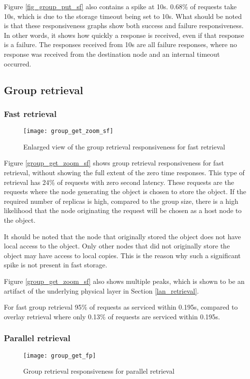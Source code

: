 Figure \ref{fig_group_put_sf} also contains a spike at 10s. 0.68\% of requests take 10s, which is due to the storage timeout being set to 10s. What should be noted is that these responsiveness graphs show both success and failure responsiveness. In other words, it shows how quickly a response is received, even if that response is a failure. The responses received from 10s are all failure responses, where no response was received from the destination node and an internal timeout occurred.

\subsection{Group retrieval}
\subsubsection{Fast retrieval}

\begin{figure}[htbp]
 \centering
 \texttt{[image: group\_get\_zoom\_sf]}
 \caption{Enlarged view of the group retrieval responsiveness for fast retrieval}
 \label{fig_group_get_zoom_sf}
\end{figure}
%
Figure \ref{group_get_zoom_sf} shows group retrieval responsiveness for fast retrieval, without showing the full extent of the zero time responses. This type of retrieval has 24\% of requests with zero second latency. These requests are the requests where the node generating the object is chosen to store the object. If the required number of replicas is high, compared to the group size, there is a high likelihood that the node originating the request will be chosen as a host node to the object.

It should be noted that the node that originally stored the object does not have local access to the object. Only other nodes that did not originally store the object may have access to local copies. This is the reason why such a significant spike is not present in fast storage.

Figure \ref{group_get_zoom_sf} also shows multiple peaks, which is shown to be an artifact of the underlying physical layer in Section \ref{lan_retrieval}.

For fast group retrieval 95\% of requests as serviced within 0.195s, compared to overlay retrieval where only 0.13\% of requests are serviced within 0.195s.

\subsubsection{Parallel retrieval}
\begin{figure}[htbp]
 \centering
 \texttt{[image: group\_get\_fp]}
 \caption{Group retrieval responsiveness for parallel retrieval}
 \label{fig_group_get_fp}
\end{figure}

